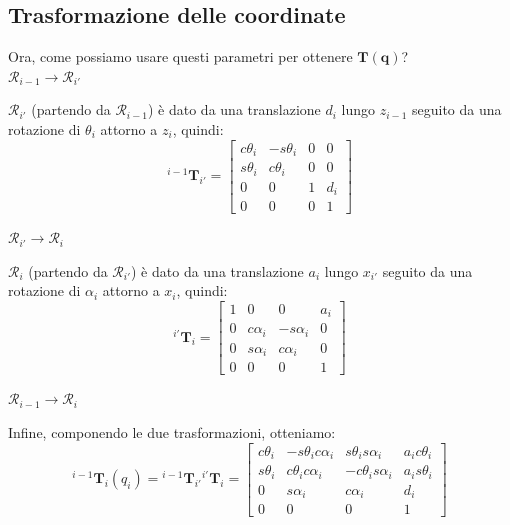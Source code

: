 \subsection{Trasformazione delle coordinate}
Ora, come possiamo usare questi parametri per ottenere $\mathbf{T(q)}$?\\


 \boldmath$\mathcal{R}_{i-1} \rightarrow \mathcal{R}_{i'}$\unboldmath

$\mathcal{R}_{i'}$ (partendo da $\mathcal{R}_{i-1}$) è dato da una translazione $d_i$ lungo $z_{i-1}$ seguito da una rotazione di $\theta_i$ attorno a $z_i$, quindi:
$$
{}^{i-1}\mathbf{T}_{i'}
=
\begin{bmatrix}
	c\theta_i & -s\theta_i & 0 & 0 \\
	s\theta_i & c\theta_i & 0 & 0 \\
	0 & 0 & 1 & d_i \\
	0 & 0 & 0 & 1
\end{bmatrix}
$$


\vspace*{5pt}
 \boldmath$\mathcal{R}_{i'} \rightarrow \mathcal{R}_{i}$\unboldmath

$\mathcal{R}_{i}$ (partendo da $\mathcal{R}_{i'}$) è dato da una translazione $a_i$ lungo $x_{i'}$ seguito da una rotazione di $\alpha_i$ attorno a $x_i$, quindi:
$$
{}^{i'}\mathbf{T}_{i}
=
\begin{bmatrix}
	1 & 0 & 0 & a_i \\
	0 & c\alpha_i & -s\alpha_i & 0 \\
	0 & s\alpha_i & c\alpha_i & 0 \\
	0 & 0 & 0 & 1
\end{bmatrix}
$$



\vspace*{5pt}
 \boldmath$\mathcal{R}_{i-1} \rightarrow \mathcal{R}_{i}$\unboldmath

Infine, componendo le due trasformazioni, otteniamo:
$$
{}^{i-1}\mathbf{T}_{i}(q_i)
=
{}^{i-1}\mathbf{T}_{i'}
{}^{i'}\mathbf{T}_{i}
=
\begin{bmatrix}
	c\theta_i & -s\theta_ic\alpha_i & s\theta_is\alpha_i & a_ic\theta_i \\
	s\theta_i & c\theta_ic\alpha_i & -c\theta_is\alpha_i & a_is\theta_i \\
	0 & s\alpha_i & c\alpha_i & d_i \\
	0 & 0 & 0 & 1
\end{bmatrix}
$$

